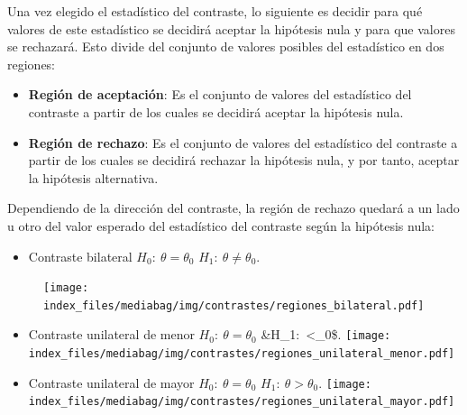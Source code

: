 \documentclass[
  a4paper,
]{scrreport}
\providecommand{\tightlist}{%
  \setlength{\itemsep}{0pt}\setlength{\parskip}{0pt}}\usepackage{longtable,booktabs,array}
\theoremstyle{definition}
\theoremstyle{definition}
\theoremstyle{plain}
\theoremstyle{remark}
\begin{document}
Una vez elegido el estadístico del contraste, lo siguiente es decidir
para qué valores de este estadístico se decidirá aceptar la hipótesis
nula y para que valores se rechazará. Esto divide del conjunto de
valores posibles del estadístico en dos regiones:

\begin{itemize}
\item
  \textbf{Región de aceptación}: Es el conjunto de valores del
  estadístico del contraste a partir de los cuales se decidirá aceptar
  la hipótesis nula.
\item
  \textbf{Región de rechazo}: Es el conjunto de valores del estadístico
  del contraste a partir de los cuales se decidirá rechazar la hipótesis
  nula, y por tanto, aceptar la hipótesis alternativa.
\end{itemize}

Dependiendo de la dirección del contraste, la región de rechazo quedará
a un lado u otro del valor esperado del estadístico del contraste según
la hipótesis nula:

\begin{itemize}
\tightlist
\item
  Contraste bilateral \(H_0:\ \theta=\theta_0\)
  \(H_1:\ \theta\neq\theta_0\).
\end{itemize}

\begin{figure}

{\centering \texttt{[image: index\_files/mediabag/img/contrastes/regiones\_bilateral.pdf]}

}

\end{figure}

\begin{itemize}
\item
  Contraste unilateral de menor \(H_0:\ \theta=\theta_0\)
  \&H\_1:~\theta\textless{}\theta\_0\$.
  \texttt{[image: index\_files/mediabag/img/contrastes/regiones\_unilateral\_menor.pdf]}
\item
  Contraste unilateral de mayor \(H_0:\ \theta=\theta_0\)
  \(H_1:\ \theta>\theta_0\).
  \texttt{[image: index\_files/mediabag/img/contrastes/regiones\_unilateral\_mayor.pdf]}
\end{itemize}
\end{document}
